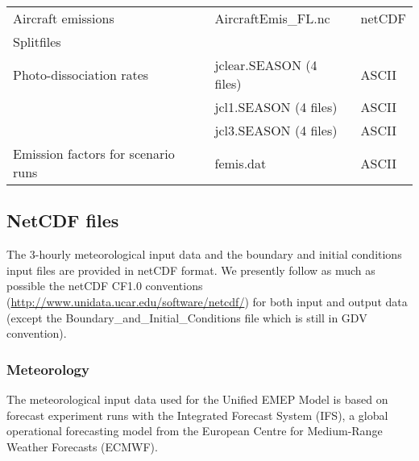 \begin{table}
\begin{small}
\begin{tabular}{lll}
Aircraft emissions & AircraftEmis\_FL.nc & netCDF \\
Splitfiles & &\\
Photo-dissociation rates & jclear.SEASON \quad (4 files) & ASCII\\
 & jcl1.SEASON \quad (4 files) & ASCII\\
 & jcl3.SEASON \quad (4 files) & ASCII\\
Emission factors for scenario runs & femis.dat & ASCII\\
\hline
\end{tabular}
\end{small}


\end{table}

\subsection{NetCDF files}


The 3-hourly meteorological input data and the boundary and initial 
conditions input files are provided in netCDF format. 
We presently follow as much as possible the netCDF CF1.0 conventions 
(\url{http://www.unidata.ucar.edu/software/netcdf/}) for both input
and output data (except the Boundary\_and\_Initial\_Conditions file which
is still in GDV convention).

\subsubsection{Meteorology}

The meteorological input data used for the Unified EMEP Model is based on
forecast experiment runs with the Integrated Forecast System (IFS), a global
operational forecasting model from the European Centre for Medium-Range
Weather Forecasts (ECMWF).

